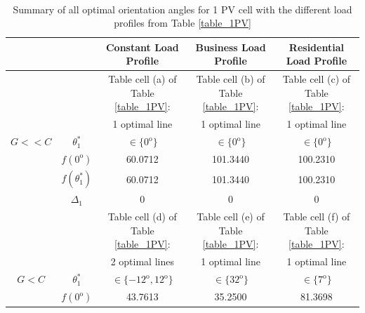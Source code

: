 \newpage

\renewcommand\thetable{\arabic{tablemajor}.\arabic{table}}
\newcommand*\settablecounter[2]{%
        \setcounter{tablemajor}{#1}%
        \setcounter{table}{#2-1}%
}
\settablecounter{2}{3}

\begin{table}
 \centering
\captionsetup{justification=centering}
\caption{\\ Summary of all optimal orientation angles for 1 PV cell with the different load profiles from Table \ref{table_1PV} \label{opt_1PV}}
  \begin{tabular}
      {c|c||c|c|c} 
		\multicolumn{2}{c||}{ }	&  Constant Load Profile  & Business Load Profile  &  Residential Load Profile  \\
			
      \hline\hline
						  &&  Table cell (a) of Table \ref{table_1PV}:    &Table cell (b) of Table \ref{table_1PV}:     &Table cell (c) of Table \ref{table_1PV}:     \\  
			  &&  1 optimal line   & 1 optimal line &1 optimal line  \\  
				
				 $G<<C$&      $\theta_1^*$     &     $\in \{0^\mathrm{o}\}$     &     $\in \{0^\mathrm{o}\}$   &  $\in \{0^\mathrm{o}\}$\\\cline{2-5}		
				
				&   $f(0^\mathrm{o})$ & 60.0712& 101.3440 & 100.2310 \\\cline{2-5}	
				
				& $f(\theta_1^*)$  & 60.0712& 101.3440 &	100.2310\\\cline{2-5}	
				
				&  $\Delta_1$  & 0&  0 &	0\\ \hline
	
				&&  Table cell (d) of Table \ref{table_1PV}:    &Table cell (e) of Table \ref{table_1PV}:     &Table cell (f) of Table \ref{table_1PV}:     \\  
				& &2 optimal lines    & 1 optimal line    &1 optimal line   \\  
				
			$G<C$	&      $\theta_1^*$     &    $\in \{-12^\mathrm{o},12^\mathrm{o}\}$  &  $\in \{32^\mathrm{o}\}$      &  $\in \{7^\mathrm{o}\}$  \\\cline{2-5}	
				
				 &   $f(0^\mathrm{o})$ &43.7613 &  35.2500 &81.3698 \\\cline{2-5}	
					

\end{tabular}
\end{table}
